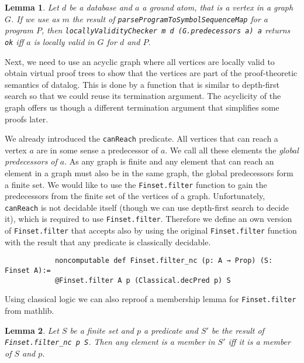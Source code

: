 \documentclass{article}
\newtheorem{lemma}{Lemma}
\begin{document}
        \begin{lemma}
            Let $d$ be a database and $a$ a ground atom, that is a vertex in a graph $G$.
            If we use as $m$ the result of \texttt{parseProgramToSymbolSequenceMap} for a program $P$, then \texttt{locallyValidityChecker m d (G.predecessors a) a} returns \texttt{ok} iff $a$ is locally valid in $G$ for $d$ and $P$.
        \end{lemma}

        Next, we need to use an acyclic graph where all vertices are locally valid to obtain virtual proof trees to show that the vertices are part of the proof-theoretic semantics of datalog. This is done by a function that is similar to depth-first search so that we could reuse its termination argument. The acyclicity of the graph offers us though a different termination argument that simplifies some proofs later.

        We already introduced the \texttt{canReach} predicate. All vertices that can reach a vertex $a$ are in some sense a predecessor of $a$. We call all these elements the \textit{global predecessors of $a$}. As any graph is finite and any element that can reach an element in a graph must also be in the same graph, the global predecessors form a finite set. We would like to use the \texttt{Finset.filter} function to gain the predecessors from the finite set of the vertices of a graph. Unfortunately, \texttt{canReach} is not decidable itself (though we can use depth-first search to decide it), which is required to use \texttt{Finset.filter}. Therefore we define an own version of \texttt{Finset.filter} that accepts also by using the original \texttt{Finset.filter} function with the result that any predicate is classically decidable.

        \begin{lstlisting}
            noncomputable def Finset.filter_nc (p: A → Prop) (S: Finset A):= 
            @Finset.filter A p (Classical.decPred p) S
        \end{lstlisting}

        Using classical logic we can also reproof a membership lemma for \texttt{Finset.filter} from mathlib.

        \begin{lemma}
            Let $S$ be a finite set and $p$ a predicate and $S'$ be the result of \texttt{Finset.filter\_nc p S}. Then any element is a member in $S'$ iff it is a member of $S$ and $p$.
        \end{lemma}
\end{document}
